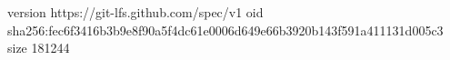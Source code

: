 version https://git-lfs.github.com/spec/v1
oid sha256:fec6f3416b3b9e8f90a5f4dc61e0006d649e66b3920b143f591a411131d005c3
size 181244
